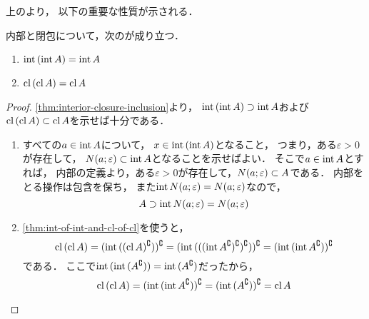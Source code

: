 \documentclass[../sotsu.tex]{subfiles}
\begin{document}
上のより，
以下の重要な性質が示される．

\begin{theorem}
    \label{thm:int-of-int-and-cl-of-cl}
    内部と閉包について，次のが成り立つ．
    \begin{enumerate}
        \item $\operatorname{int}{(\operatorname{int}{A})} = \operatorname{int}{A}$
        \item $\operatorname{cl}{(\operatorname{cl}{A})} = \operatorname{cl}{A}$
    \end{enumerate}
\end{theorem}

\begin{proof}
    \cref{thm:interior-closure-inclusion}より，
    $\operatorname{int}{(\operatorname{int}{A})} \supset \operatorname{int}{A}$および$\operatorname{cl}{(\operatorname{cl}{A})} \subset \operatorname{cl}{A}$を示せば十分である．
    \begin{enumerate}
        \item すべての$a \in \operatorname{int}{A}$について，
            $x \in \operatorname{int}{(\operatorname{int}{A})}$となること，
            つまり，ある$\varepsilon > 0$が存在して，
            $N(a; \varepsilon) \subset \operatorname{int}{A}$となることを示せばよい．
            そこで$a \in \operatorname{int}{A}$とすれば，
            内部の定義より，ある$\varepsilon > 0$が存在して，$N(a; \varepsilon) \subset A$である．
            内部をとる操作は包含を保ち，
            また$\operatorname{int}{N(a; \varepsilon)} = N(a; \varepsilon)$なので，
            \[  A \supset \operatorname{int}{N(a; \varepsilon)} = N(a; \varepsilon)  \]
        \item \cref{thm:int-of-int-and-cl-of-cl}を使うと，
            \[
                \operatorname{cl}{(\operatorname{cl}{A})} 
                = (\operatorname{int}{((\operatorname{cl}{A})^\complement)})^\complement  
                = (
                    \operatorname{int}{(
                        (
                            (\operatorname{int}{A^\complement})^\complement
                        )^\complement
                    )}
                  )^\complement  
                = (\operatorname{int}{(\operatorname{int}{A^\complement})})^\complement  
            \]
            である．
            ここで$\operatorname{int}{(\operatorname{int}{(A^\complement)})} = \operatorname{int}{(A^\complement)}$だったから，
            \[
                \operatorname{cl}{(\operatorname{cl}{A})} 
                = (\operatorname{int}{(\operatorname{int}{A^\complement})})^\complement  
                = (\operatorname{int}{(A^\complement)})^\complement
                = \operatorname{cl}{A}
                \qedhere
            \]
    \end{enumerate}
\end{proof}
\end{document}

